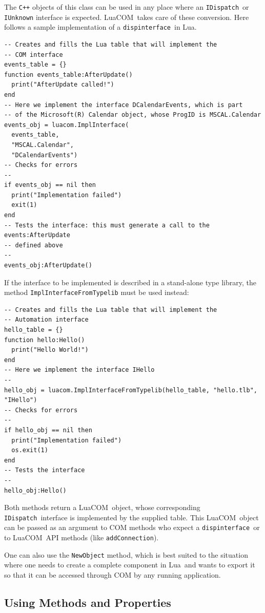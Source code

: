 \documentclass[11pt,a4paper,english]{report}
\newcommand{\ident}[1]{\mbox{\texttt{#1}}}
\newcommand{\techname}[1]{\mbox{#1}}
\newcommand{\lua}{\techname{Lua}}
\newcommand{\luacom}{\techname{LuaCOM}}
\newcommand{\idispatch}{\ident{IDispatch}}
\newcommand{\dispinterface}{\ident{dispinterface}}
\begin{document}
The \ident{C++} objects of this class can be used in any place where
an \idispatch\ or \ident{IUnknown} interface is expected. \luacom\
takes care of these conversion. Here follows a sample implementation of a
\dispinterface\ in Lua.

\begin{verbatim}
-- Creates and fills the Lua table that will implement the
-- COM interface
events_table = {}
function events_table:AfterUpdate()
  print("AfterUpdate called!")
end
-- Here we implement the interface DCalendarEvents, which is part
-- of the Microsoft(R) Calendar object, whose ProgID is MSCAL.Calendar
events_obj = luacom.ImplInterface(
  events_table,
  "MSCAL.Calendar",
  "DCalendarEvents")
-- Checks for errors
--
if events_obj == nil then
  print("Implementation failed")
  exit(1)
end
-- Tests the interface: this must generate a call to the events:AfterUpdate
-- defined above
--
events_obj:AfterUpdate()
\end{verbatim}

  If the interface to be implemented is described in a stand-alone
  type library, the method \verb+ImplInterfaceFromTypelib+
  must be used instead:



\begin{verbatim}
-- Creates and fills the Lua table that will implement the
-- Automation interface
hello_table = {}
function hello:Hello()
  print("Hello World!")
end
-- Here we implement the interface IHello
--
hello_obj = luacom.ImplInterfaceFromTypelib(hello_table, "hello.tlb", "IHello")
-- Checks for errors
--
if hello_obj == nil then
  print("Implementation failed")
  os.exit(1)
end
-- Tests the interface
--
hello_obj:Hello()
\end{verbatim}

  Both methods return a \luacom\ object, whose corresponding
  \idispatch\ interface is implemented by the supplied table. This
  \luacom\ object can be passed as an argument to COM methods who
  expect a \dispinterface\ or to \luacom\ API methods (like
  \verb+addConnection+).

  One can also use the \verb+NewObject+ method, which is best suited
  to the situation where one needs to create a complete component in
  \lua\ and wants to export it so that it can be accessed through COM
  by any running application.



\subsection{Using Methods and Properties}
\label{sec:using-meth-prop}
\end{document}
